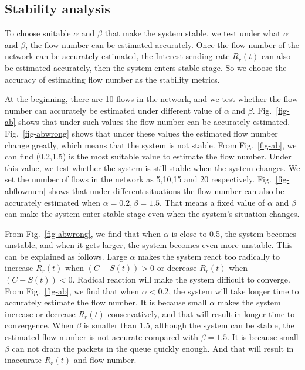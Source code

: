 \subsection{Stability analysis}
To choose suitable $\alpha$ and $\beta$ that make the system stable, we test under what $\alpha$ and $\beta$, the flow number can be estimated accurately. Once the flow number of the network can be accurately estimated, the Interest sending rate $R_{r}(t)$ can also be estimated accurately, then the system enters stable stage. So we choose the accuracy of estimating flow number as the stability metrics.

At the beginning, there are 10 flows in the network, and we test whether the flow number can accurately be estimated under different value of $\alpha$ and $\beta$. Fig.~\ref{fig-ab} shows that under such values the flow number can be accurately estimated. Fig.~\ref{fig-abwrong} shows that under these values the estimated flow number change greatly, which means that the system is not stable. From Fig.~\ref{fig-ab}, we can find (0.2,1.5) is the most suitable value to estimate the flow number. Under this value, we test whether the system is still stable when the system changes. We set the number of flows in the network as 5,10,15 and 20 respectively. Fig.~\ref{fig-abflownum} shows that under different situations the flow number can also be accurately estimated when $\alpha=0.2,  \beta=1.5$. That means a fixed value of $\alpha$ and $\beta$ can make the system enter stable stage even when the system's situation changes.

From Fig.~\ref{fig-abwrong}, we find that when $\alpha$ is close to 0.5, the system becomes unstable, and when it gets larger, the system becomes even more unstable. This can be explained as follows. Large $\alpha$ makes the system react too radically to increase $R_{r}(t)$ when $(C-S(t))>0$ or decrease $R_{r}(t)$ when $(C-S(t))<0$. Radical reaction will make the system difficult to converge. From Fig.~\ref{fig-ab}, we find that when $\alpha < 0.2$, the system will take longer time to accurately estimate the flow number. It is because small $\alpha$ makes the system increase or decrease $R_{r}(t)$ conservatively, and that will result in longer time to convergence. When $\beta$ is smaller than 1.5, although the system can be stable, the estimated flow number is not accurate compared with $\beta = 1.5$. It is because small $\beta$ can not drain the packets in the queue quickly enough. And that will result in inaccurate $R_{r}(t)$ and flow number.

